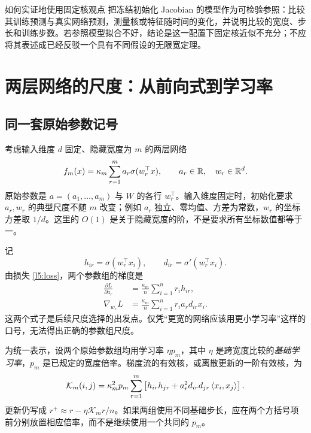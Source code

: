 \begin{coursebox}{如何实证地使用固定核观点}
把冻结初始化 Jacobian 的模型作为可检验参照：比较其训练预测与真实网络预测，测量核或特征随时间的变化，并说明比较的宽度、步长和训练步数。若参照模型拟合不好，结论是这一配置下固定核近似不充分；不应将其表述成已经反驳一个具有不同假设的无限宽定理。
\end{coursebox}

\section{两层网络的尺度：从前向式到学习率}
\label{l5:width-scaling}

\subsection{同一套原始参数记号}

考虑输入维度 $d$ 固定、隐藏宽度为 $m$ 的两层网络
\begin{equation}
 f_m(x)=\kappa_m\sum_{r=1}^m a_r\sigma(w_r^\top x),
 \qquad a_r\in\mathbb R,\quad w_r\in\mathbb R^d.
 \label{l5:two-layer}
\end{equation}
原始参数是 $a=(a_1,\ldots,a_m)$ 与 $W$ 的各行 $w_r^\top$。输入维度固定时，初始化要求 $a_r,w_r$ 的典型尺度不随 $m$ 改变；例如 $a_r$ 独立、零均值、方差为常数，$w_r$ 的坐标方差取 $1/d$。这里的 $O(1)$ 是关于隐藏宽度的阶，不是要求所有坐标数值都等于一。

记
\[
 h_{ir}=\sigma(w_r^\top x_i),
 \qquad d_{ir}=\sigma'(w_r^\top x_i).
\]
由损失 \eqref{l5:loss}，两个参数组的梯度是
\begin{align}
 \frac{\partial L}{\partial a_r}
 &=\frac{\kappa_m}{n}\sum_{i=1}^n r_i h_{ir},
 \label{l5:grad-a}\\
 \nabla_{w_r}L
 &=\frac{\kappa_m}{n}\sum_{i=1}^n r_i a_r d_{ir}x_i.
 \label{l5:grad-w}
\end{align}
这两个式子是后续尺度选择的出发点。仅凭“更宽的网络应该用更小学习率”这样的口号，无法得出正确的参数组尺度。

为统一表示，设两个原始参数组均用学习率 $\eta p_m$，其中 $\eta$ 是跨宽度比较的\emph{基础学习率}，$p_m$ 是已规定的宽度倍率。梯度流的有效核，或离散更新的一阶有效核，为
\begin{equation}
 \mathcal K_m(i,j)
 =\kappa_m^2p_m\sum_{r=1}^m
 \left[h_{ir}h_{jr}
 +a_r^2d_{ir}d_{jr}\left\langle x_i,x_j\right\rangle\right].
 \label{l5:two-layer-kernel}
\end{equation}
更新仍写成 $r^+\approx r-\eta\mathcal K_m r/n$。如果两组使用不同基础步长，应在两个方括号项前分别放置相应倍率，而不是继续使用一个共同的 $p_m$。


